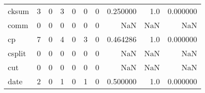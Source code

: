 \begin{longtable}{lrrrrrrrrr}
cksum     &                                                  3 &                                                  0 &                                                  3 &                                                  0 &                                                  0 &                                                  0 &                                           0.250000 &                                    1.0 &                             0.000000 \\
comm      &                                                  0 &                                                  0 &                                                  0 &                                                  0 &                                                  0 &                                                  0 &                                                NaN &                                    NaN &                                  NaN \\
cp        &                                                  7 &                                                  0 &                                                  4 &                                                  0 &                                                  3 &                                                  0 &                                           0.464286 &                                    1.0 &                             0.000000 \\
csplit    &                                                  0 &                                                  0 &                                                  0 &                                                  0 &                                                  0 &                                                  0 &                                                NaN &                                    NaN &                                  NaN \\
cut       &                                                  0 &                                                  0 &                                                  0 &                                                  0 &                                                  0 &                                                  0 &                                                NaN &                                    NaN &                                  NaN \\
date      &                                                  2 &                                                  0 &                                                  1 &                                                  0 &                                                  1 &                                                  0 &                                           0.500000 &                                    1.0 &                             0.000000 \\

\end{longtable}
